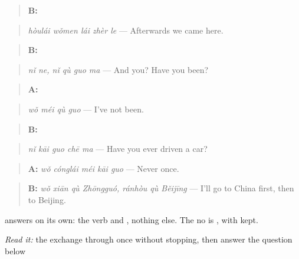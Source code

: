\begin{quote}
\textbf{B:} 
\end{quote}

\begin{quote}
\emph{hòulái wǒmen lái zhèr le} — Afterwards we came here.
\end{quote}

\begin{quote}
\textbf{B:}  
\end{quote}

\begin{quote}
\emph{nǐ ne, nǐ qù guo ma} — And you? Have you been?
\end{quote}

\begin{quote}
\textbf{A:} 
\end{quote}

\begin{quote}
\emph{wǒ méi qù guo} — I've not been.
\end{quote}

\begin{quote}
\textbf{B:} 
\end{quote}

\begin{quote}
\emph{nǐ kāi guo chē ma} — Have you ever driven a car?
\end{quote}

\begin{quote}
\textbf{A:} \emph{wǒ cónglái méi kāi guo} — Never once.
\end{quote}

\begin{quote}
\textbf{B:} \emph{wǒ xiān qù Zhōngguó, ránhòu qù Běijīng} — I'll go to China first, then to Beijing.
\end{quote}

 answers  on its own: the verb and , nothing else. The no is , with  kept.

\begin{tcolorbox}[breakable,skin=enhanced,colback=orange!6,colframe=orange!45!black,boxrule=0.5pt,arc=1mm,left=6pt,right=6pt,top=4pt,bottom=4pt,fonttitle=\bfseries,title={Read this}]
\emph{Read it:} the exchange through once without stopping, then answer the question below
\end{tcolorbox}

